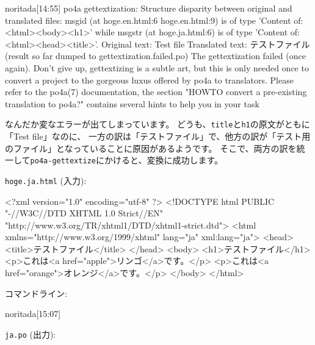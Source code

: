 \documentclass[mingoth,a4paper]{jsarticle}
\begin{document}
\begin{commandline}
noritada[14:55]%
po4a gettextization: Structure disparity between original and translated files:
msgid (at hoge.en.html:6 hoge.en.html:9) is of type 'Content of: 
<html><body><h1>' while
msgstr (at hoge.ja.html:6) is of type 'Content of: <html><head><title>'.
Original text: Test file
Translated text: テストファイル
(result so far dumped to gettextization.failed.po)
The gettextization failed (once again). Don't give up, gettextizing is a subtle 
art, but this is only needed once to convert a project to the gorgeous luxus 
offered by po4a to translators.
Please refer to the po4a(7) documentation, the section "HOWTO convert a 
pre-existing translation to po4a?" contains several hints to help you in your 
task
\end{commandline}

なんだか変なエラーが出てしまっています。
どうも、\texttt{title}と\texttt{h1}の原文がともに「Test file」なのに、
一方の訳は「テストファイル」で、他方の訳が「テスト用のファイル」となっていることに原因があるようです。
そこで、両方の訳を統一して\texttt{po4a-gettextize}にかけると、変換に成功します。

\texttt{hoge.ja.html} (入力):

\begin{commandline}
<?xml version="1.0" encoding="utf-8" ?>
<!DOCTYPE html PUBLIC "-//W3C//DTD XHTML 1.0 Strict//EN"
"http://www.w3.org/TR/xhtml1/DTD/xhtml1-strict.dtd">
<html xmlns="http://www.w3.org/1999/xhtml" lang="ja" xml:lang="ja">
<head>
<title>テストファイル</title>
</head>
<body>
<h1>テストファイル</h1>
<p>これは<a href="apple">リンゴ</a>です。</p>
<p>これは<a href="orange">オレンジ</a>です。</p>
</body>
</html>
\end{commandline}

コマンドライン:

\begin{commandline}
noritada[15:07]%
\end{commandline}

\texttt{ja.po} (出力):
\end{document}
